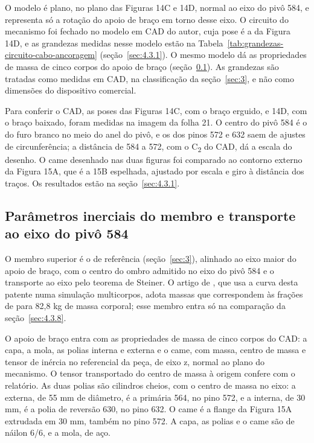 O modelo é plano, no plano das Figuras 14C e 14D, normal ao eixo do pivô 584, e representa só a rotação do apoio de braço em torno desse eixo. O circuito do mecanismo foi fechado no modelo em CAD do autor, cuja pose é a da Figura 14D, e as grandezas medidas nesse modelo estão na Tabela~\ref{tab:grandezas-circuito-cabo-ancoragem} (seção~\ref{sec:4.3.1}). O mesmo modelo dá as propriedades de massa de cinco corpos do apoio de braço (seção~\ref{sec:3.3.2}). As grandezas são tratadas como medidas em CAD, na classificação da seção~\ref{sec:3}, e não como dimensões do dispositivo comercial.

Para conferir o CAD, as poses das Figuras 14C, com o braço erguido, e 14D, com o braço baixado, foram medidas na imagem da folha 21. O centro do pivô 584 é o do furo branco no meio do anel do pivô, e os dos pinos 572 e 632 saem de ajustes de circunferência; a distância de 584 a 572, com o C\textsubscript{2} do CAD, dá a escala do desenho. O came desenhado nas duas figuras foi comparado ao contorno externo da Figura 15A, que é a 15B espelhada, ajustado por escala e giro à distância dos traços. Os resultados estão na seção~\ref{sec:4.3.1}.

\subsection{Parâmetros inerciais do membro e transporte ao eixo do pivô 584}\label{sec:3.3.2}

O membro superior é o de referência (seção~\ref{sec:3}), alinhado ao eixo maior do apoio de braço, com o centro do ombro admitido no eixo do pivô 584 e o transporte ao eixo pelo teorema de Steiner. O artigo de \textcite{okabe2026}, que usa a curva desta patente numa simulação multicorpos, adota massas que correspondem às frações de \textcite{deleva1996} para 82,8 kg de massa corporal; esse membro entra só na comparação da seção~\ref{sec:4.3.8}.

O apoio de braço entra com as propriedades de massa de cinco corpos do CAD: a capa, a mola, as polias interna e externa e o came, com massa, centro de massa e tensor de inércia no referencial da peça, de eixo z, normal ao plano do mecanismo. O tensor transportado do centro de massa à origem confere com o relatório. As duas polias são cilindros cheios, com o centro de massa no eixo: a externa, de 55 mm de diâmetro, é a primária 564, no pino 572, e a interna, de 30 mm, é a polia de reversão 630, no pino 632. O came é a flange da Figura 15A extrudada em 30 mm, também no pino 572. A capa, as polias e o came são de náilon 6/6, e a mola, de aço.

